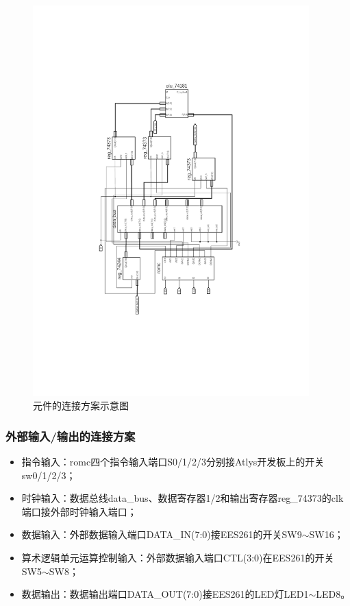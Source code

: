 \documentclass[a4paper]{ctexart}
\begin{document}
\begin{spacing}{1.3}
	\begin{figure}[htbp]
		\centering
		\includegraphics[width=0.95\textwidth]{figure/final.pdf}
		\caption{元件的连接方案示意图}\label{fig:连接示意图}
	\end{figure}

	\subsubsection{外部输入/输出的连接方案}
	\begin{itemize}
		\item 指令输入：romc四个指令输入端口S0/1/2/3分别接Atlys开发板上的开关sw0/1/2/3；
		\item 时钟输入：数据总线data\_bus、数据寄存器1/2和输出寄存器reg\_74373的clk端口接外部时钟输入端口；
		\item 数据输入：外部数据输入端口DATA\_IN(7:0)接EES261的开关SW9$\sim$SW16；
		\item 算术逻辑单元运算控制输入：外部数据输入端口CTL(3:0)在EES261的开关SW5$\sim$SW8；
		\item 数据输出：数据输出端口DATA\_OUT(7:0)接EES261的LED灯LED1$\sim$LED8。
	\end{itemize}


\end{spacing}
\end{document}
